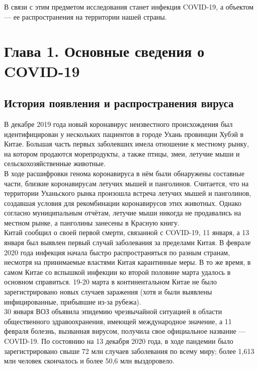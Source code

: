 \documentclass[a4paper, 12pt]{extarticle}
\begin{document}
В связи с этим предметом исследования станет инфекция
COVID-19, а объектом — ее распространения на территории нашей страны.
\newpage

\section{Глава 1. Основные сведения о COVID-19}

\subsection{История появления и распространения вируса}

\vspace{5mm}

В декабре 2019 года новый коронавирус неизвестного происхождения был
идентифицирован у нескольких пациентов в городе Ухань провинции Хубэй в Китае.
Большая часть первых заболевших имела отношение к местному рынку, на котором
продаются морепродукты, а также птицы, змеи, летучие мыши и
сельскохозяйственные животные.
\\

В ходе расшифровки генома коронавируса в нём были обнаружены составные части, близкие коронавирусам летучих мышей и
панголинов. Считается, что на территории Уханьского рынка произошла встреча
летучих мышей и панголинов, создавшая условия для рекомбинации коронавирусов
этих животных. Однако согласно муниципальным отчётам, летучие мыши никогда не
продавались на местном рынке, а панголины занесены в Красную книгу.
\\

Китай сообщил о своей первой смерти, связанной с COVID-19, 11 января, а 13
января был выявлен первый случай заболевания за пределами Китая. В феврале 2020
года инфекция начала быстро распространяться по разным странам, несмотря на
принимаемые властями Китая карантинные меры. В то же время, в самом Китае со
вспышкой инфекции ко второй половине марта удалось в основном справиться. 19-20
марта в континентальном Китае не было зарегистрировано новых случаев заражения
(хотя и были выявлены инфицированные, прибывшие из-за рубежа).
\\

30 января ВОЗ объявила эпидемию чрезвычайной ситуацией в области общественного
здравоохранения, имеющей международное значение, а 11 февраля болезнь,
вызванная вирусом, получила свое официальное название — COVID-19. По состоянию
на 13 декабря 2020 года, в ходе пандемии было зарегистрировано свыше 72 млн
случаев заболевания по всему миру; более  1,613 млн человек скончалось и более
50,6 млн выздоровело.
\\
\end{document}
